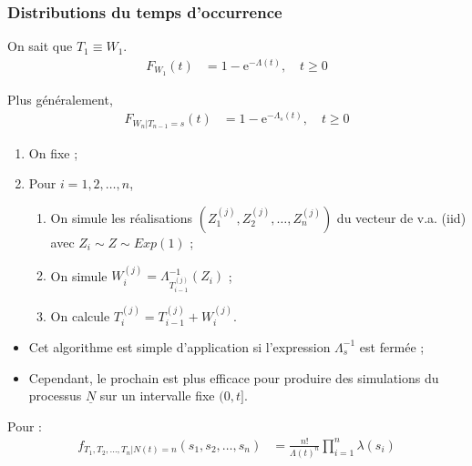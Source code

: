 \documentclass[10pt, french]{article}
\begin{document}
\begin{multicols*}{2}
\subsubsection*{Distributions du temps d'occurrence}
On sait que $T_{1}	\equiv	W_{1}$.
\begin{align*}
	F_{W_{1}}(t)
	&=	1	-	\textrm{e}^{-\Lambda(t)}, \quad t \geq 0
\end{align*}

Plus généralement, 
\begin{align*}
	F_{W_{n} | T_{n - 1} = s}(t)
	&=	1	-	\textrm{e}^{-\Lambda_{s}(t)},\quad t \geq 0
\end{align*}

\begin{algo2}
\begin{enumerate}
	\item	On fixe  ;
	\item	Pour $i	=	1, 2, \dots, n$, 
		\begin{enumerate}[label = \alph*)]
		\item	On simule les réalisations $\left( Z_{1}^{(j)}, Z_{2}^{(j)}, \dots, Z_{n}^{(j)}\right)$ du vecteur de v.a. (iid) avec $Z_{i} \sim Z \sim Exp(1)$ ;
		\item	On simule $W_{i}^{(j)}	=	\Lambda^{-1}_{T_{i - 1}^{(j)}}(Z_{i})$ ;
		\item	On calcule $T_{i}^{(j)}	=	T_{i - 1}^{(j)} + W_{i}^{(j)}$.
		\end{enumerate}
\end{enumerate}

\tcbline

\begin{itemize}
	\item	Cet algorithme est simple d'application si l'expression $\Lambda_{s}^{-1}$ est fermée ;
	\item	Cependant, le prochain est plus efficace pour produire des simulations du processus $\underline{N}$ sur un intervalle fixe $(0, t]$.
\end{itemize}
\end{algo2}

Pour  :
\begin{align*}
	f_{T_{1}, T_{2}, \dots, T_{n} | N(t)	=	n}(s_{1}, s_{2}, \dots, s_{n})	
	&=	\frac{n!}{\Lambda(t)^{n}}\prod_{i = 1}^{n}\lambda(s_{i})	\\
\end{align*}


\end{multicols*}
\end{document}
